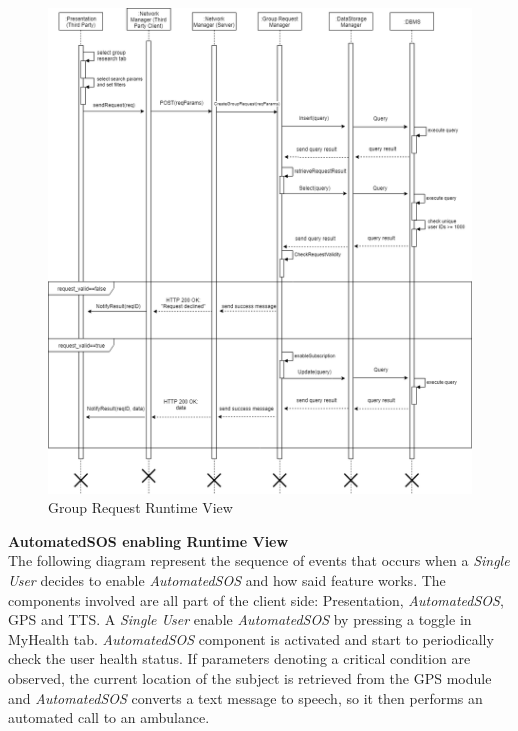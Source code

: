 \documentclass[titlepage]{article}
\begin{document}
\begin{figure}[H]
	\center
  	\includegraphics[width=15cm]{GroupRequest.png}
  	\caption{Group Request Runtime View}
 	\label{fig:GRPREQ}
\end{figure}
\noindent
{\bf AutomatedSOS enabling Runtime View }\\ 
The following diagram represent the sequence of events that occurs when a {\it Single User} decides to enable {\it AutomatedSOS} and how said feature works.
The components involved are all part of the client side: Presentation, {\it AutomatedSOS}, GPS and TTS. A {\it Single User} enable {\it AutomatedSOS} by pressing a toggle in MyHealth tab.
{\it AutomatedSOS} component is activated and start to periodically check the user health status. If parameters denoting a critical condition are observed, the current location of the subject is retrieved from the GPS module and {\it AutomatedSOS} converts a text message to speech, so it then performs an automated call to an ambulance.
\end{document}
